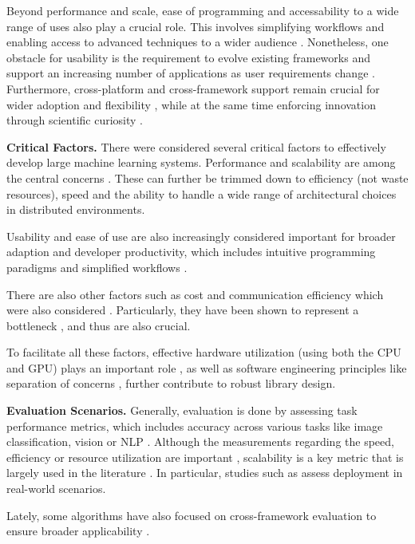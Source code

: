 Beyond performance and scale, ease of programming and accessability to a wide range of uses also
play a crucial role. This involves simplifying workflows and enabling access to advanced techniques
to a wider audience . Nonetheless, one obstacle for usability is the
requirement to evolve existing frameworks and support an increasing number of applications as user
requirements change . Furthermore, cross-platform and cross-framework support remain
crucial for wider adoption and flexibility , while at the same time enforcing
innovation through scientific curiosity .

\textbf{Critical Factors.}
There were considered several critical factors to effectively develop large machine learning systems.
Performance and scalability are among the central concerns . These
can further be trimmed down to efficiency (not waste resources), speed and the ability to handle
a wide range of architectural choices in distributed environments.

Usability and ease of use are also increasingly considered important for broader adaption and
developer productivity, which includes intuitive programming paradigms and simplified workflows
.

There are also other factors such as cost and communication efficiency which were also considered
. Particularly, they have been shown to represent a bottleneck ,
and thus are also crucial.

To facilitate all these factors, effective hardware utilization (using both the CPU and GPU) plays
an important role , as well as software engineering principles like separation of
concerns , further contribute to robust library design.

\textbf{Evaluation Scenarios.}
Generally, evaluation is done by assessing task performance metrics, which includes accuracy
across various tasks like image classification, vision or NLP .
Although the measurements regarding the speed, efficiency or resource utilization are important
, scalability is a key metric that is largely used in the literature
. In particular, studies such as  assess deployment
in real-world scenarios.

Lately, some algorithms have also focused on cross-framework evaluation to ensure broader
applicability .

